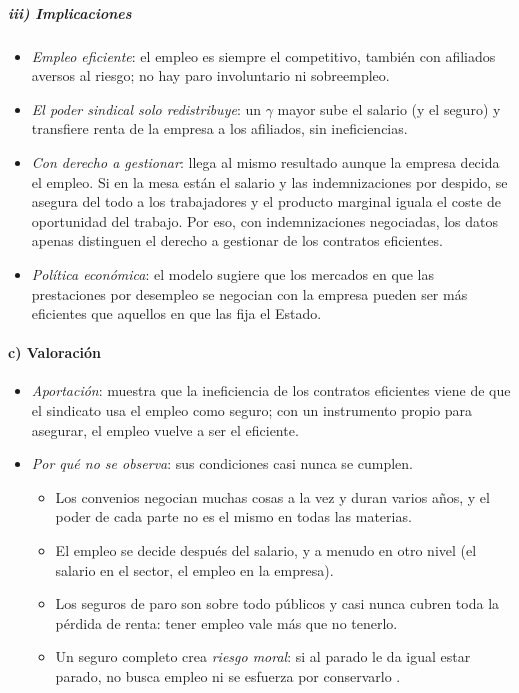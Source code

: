 \documentclass[11pt]{article}
\begin{document}
\subparagraph{iii) Implicaciones}

\begin{itemize}
\item \emph{Empleo eficiente}: el empleo es siempre el competitivo, también con afiliados aversos al riesgo; no hay paro involuntario ni sobreempleo.
\item \emph{El poder sindical solo redistribuye}: un $\gamma$ mayor sube el salario (y el seguro) y transfiere renta de la empresa a los afiliados, sin ineficiencias.
\item \emph{Con derecho a gestionar}: \textcite{Booth1995Layoffs} llega al mismo resultado aunque la empresa decida el empleo. Si en la mesa están el salario y las indemnizaciones por despido, se asegura del todo a los trabajadores y el producto marginal iguala el coste de oportunidad del trabajo. Por eso, con indemnizaciones negociadas, los datos apenas distinguen el derecho a gestionar de los contratos eficientes.
\item \emph{Política económica}: el modelo sugiere que los mercados en que las prestaciones por desempleo se negocian con la empresa pueden ser más eficientes que aquellos en que las fija el Estado.
\end{itemize}

\paragraph{c) Valoración}

\begin{itemize}
\item \emph{Aportación}: muestra que la ineficiencia de los contratos eficientes viene de que el sindicato usa el empleo como seguro; con un instrumento propio para asegurar, el empleo vuelve a ser el eficiente.
\item \emph{Por qué no se observa}: sus condiciones casi nunca se cumplen.
  \begin{itemize}
  \item Los convenios negocian muchas cosas a la vez y duran varios años, y el poder de cada parte no es el mismo en todas las materias.
  \item El empleo se decide después del salario, y a menudo en otro nivel (el salario en el sector, el empleo en la empresa).
  \item Los seguros de paro son sobre todo públicos y casi nunca cubren toda la pérdida de renta: tener empleo vale más que no tenerlo.
  \item Un seguro completo crea \emph{riesgo moral}: si al parado le da igual estar parado, no busca empleo ni se esfuerza por conservarlo .
  \end{itemize}
\end{itemize}
\end{document}
